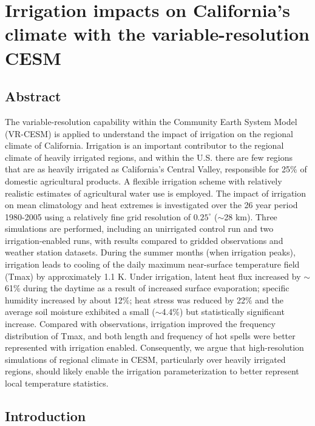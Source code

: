 \chapter{Irrigation impacts on California's climate with the variable-resolution CESM}
%

\section{Abstract}

The variable-resolution capability within the Community Earth System Model (VR-CESM) is applied to understand the impact of irrigation on the regional climate of California. Irrigation is an important contributor to the regional climate of heavily irrigated regions, and within the U.S. there are few regions that are as heavily irrigated as California's Central Valley, responsible for 25$\%$ of domestic agricultural products. A flexible irrigation scheme with relatively realistic estimates of agricultural water use is employed. The impact of irrigation on mean climatology and heat extremes is investigated over the 26 year period 1980-2005 using a relatively fine grid resolution of $0.25^\circ$ ($\sim$28 km). Three simulations are performed, including an unirrigated control run and two irrigation-enabled runs, with results compared to gridded observations and weather station datasets. During the summer months (when irrigation peaks), irrigation leads to cooling of the daily maximum near-surface temperature field (Tmax) by approximately 1.1 K. Under irrigation, latent heat flux increased by $\sim$61$\%$ during the daytime as a result of increased surface evaporation; specific humidity increased by about 12$\%$; heat stress was reduced by 22$\%$ and the average soil moisture exhibited a small ($\sim$4.4$\%$) but statistically significant increase. Compared with observations, irrigation improved the frequency distribution of Tmax, and both length and frequency of hot spells were better represented with irrigation enabled. Consequently, we argue that high-resolution simulations of regional climate in CESM, particularly over heavily irrigated regions, should likely enable the irrigation parameterization to better represent local temperature statistics.


\section{Introduction}

